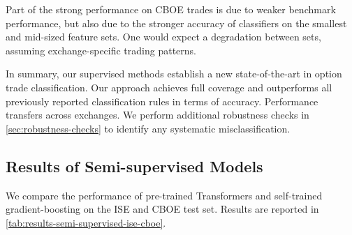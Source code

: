 Part of the strong performance on \gls{CBOE} trades is due to weaker benchmark performance, but also due to the stronger accuracy of classifiers on the smallest and mid-sized feature sets. One would expect a degradation between sets, assuming exchange-specific trading patterns.

In summary, our supervised methods establish a new state-of-the-art in option trade classification. Our approach achieves full coverage and outperforms all previously reported classification rules in terms of accuracy. Performance transfers across exchanges. We perform additional robustness checks in \cref{sec:robustness-checks} to identify any systematic misclassification.

\subsection{Results of Semi-supervised
    Models}\label{sec:results-of-semi-supervised-models}


We compare the performance of pre-trained Transformers and self-trained gradient-boosting on the \gls{ISE} and \gls{CBOE} test set. Results are reported in \cref{tab:results-semi-supervised-ise-cboe}.

